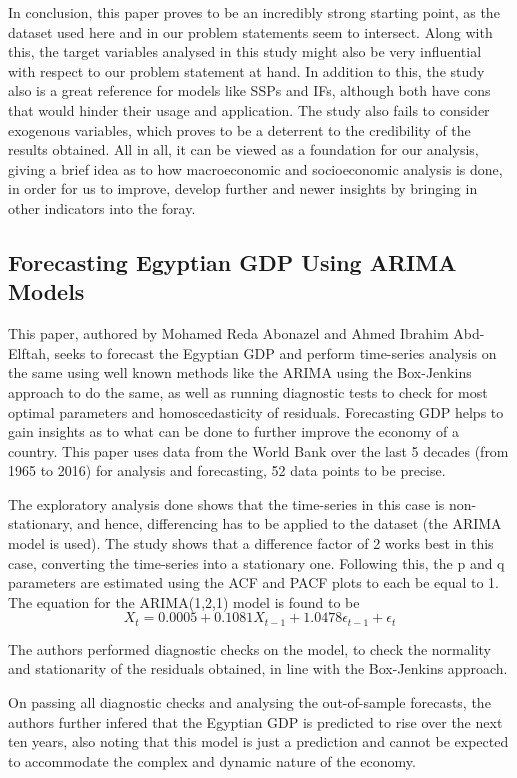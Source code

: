 \documentclass[conference]{IEEEtran}
\begin{document}
In conclusion, this paper proves to be an incredibly strong starting point, as the dataset used here and in our problem statements seem to intersect. Along with this, the target variables analysed in this study might also be very influential with respect to our problem statement at hand. In addition to this, the study also is a great reference for models like SSPs and IFs, although both have cons that would hinder their usage and application. The study also fails to consider exogenous variables, which proves to be a deterrent to the credibility of the results obtained. All in all, it can be viewed as a foundation for our analysis, giving a brief idea as to how macroeconomic and socioeconomic analysis is done, in order for us to improve, develop further and newer insights by bringing in other indicators into the foray.

\subsection{Forecasting Egyptian GDP Using ARIMA Models}

This paper, authored by Mohamed Reda Abonazel and Ahmed Ibrahim Abd-Elftah, seeks to forecast the Egyptian GDP and perform time-series analysis on the same using well known methods like the ARIMA using the Box-Jenkins approach to do the same, as well as running diagnostic tests to check for most optimal parameters and homoscedasticity of residuals. Forecasting GDP helps to gain insights as to what can be done to further improve the economy of a country. This paper uses data from the World Bank over the last 5 decades (from 1965 to 2016) for analysis and forecasting, 52 data points to be precise. 

The exploratory analysis done shows that the time-series in this case is non-stationary, and hence, differencing has to be applied to the dataset (the ARIMA model is used). The study shows that a difference factor of 2 works best in this case, converting the time-series into a stationary one. Following this, the p and q parameters are estimated using the ACF and PACF plots to each be equal to 1.
The equation for the ARIMA(1,2,1) model is found to be
\[X_t = 0.0005 + 0.1081X_{t-1} + 1.0478\epsilon_{t-1} + \epsilon_t \]


The authors performed diagnostic checks on the model, to check the normality and stationarity of the residuals obtained, in line with the Box-Jenkins approach. 

On passing all diagnostic checks and analysing the out-of-sample forecasts, the authors further infered that the Egyptian GDP is predicted to rise over the next ten years, also noting that this model is just a prediction and cannot be expected to accommodate the complex and dynamic nature of the economy. 
\end{document}
